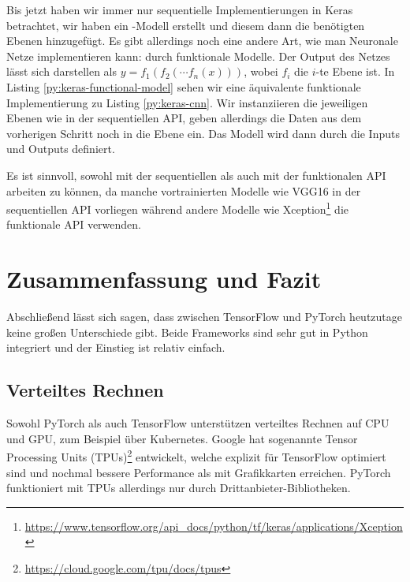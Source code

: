 Bis jetzt haben wir immer nur sequentielle Implementierungen in Keras betrachtet, wir haben ein -Modell erstellt und diesem dann 
die benötigten Ebenen hinzugefügt. Es gibt allerdings noch eine andere Art, wie man Neuronale Netze implementieren kann: durch funktionale Modelle.
Der Output des Netzes lässt sich darstellen als \(y = f_1(f_2(\cdots f_n(x)))\), wobei \(f_i\) die \(i\)-te Ebene ist. 
In Listing \ref{py:keras-functional-model} sehen wir eine äquivalente funktionale Implementierung zu Listing \ref{py:keras-cnn}. 
Wir instanziieren die jeweiligen Ebenen wie in der sequentiellen API, geben allerdings die Daten aus dem vorherigen Schritt noch in die Ebene ein. 
Das Modell wird dann durch die Inputs und Outputs definiert. 



Es ist sinnvoll, sowohl mit der sequentiellen als auch mit der funktionalen API arbeiten zu können, da manche vortrainierten Modelle wie VGG16 in der 
sequentiellen API vorliegen während andere Modelle wie Xception\footnote{\url{https://www.tensorflow.org/api_docs/python/tf/keras/applications/Xception}}
die funktionale API verwenden.

\section{Zusammenfassung und Fazit}


Abschließend lässt sich sagen, dass zwischen TensorFlow und PyTorch heutzutage keine großen Unterschiede gibt. 
Beide Frameworks sind sehr gut in Python integriert und der Einstieg ist relativ einfach. %

\subsection{Verteiltes Rechnen}
Sowohl PyTorch als auch TensorFlow unterstützen verteiltes Rechnen auf CPU und GPU, zum Beispiel über Kubernetes. 
Google hat sogenannte Tensor Processing Units (TPUs)\footnote{\url{https://cloud.google.com/tpu/docs/tpus}} entwickelt, 
welche explizit für TensorFlow optimiert sind und nochmal bessere Performance als mit Grafikkarten erreichen. 
PyTorch funktioniert mit TPUs allerdings nur durch Drittanbieter-Bibliotheken. 

